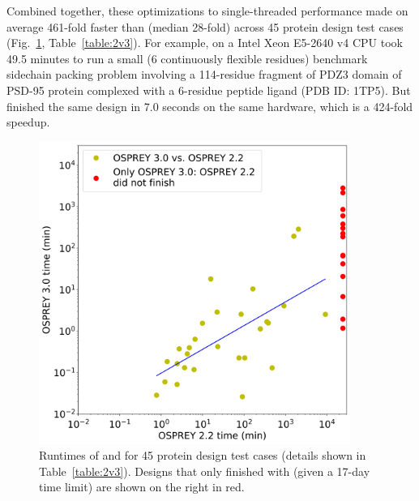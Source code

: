 Combined together, these optimizations to single-threaded performance made  on average 461-fold faster than  (median 28-fold) across 45 protein design test cases (Fig.~\ref{fig:2v3}, Table~\ref{table:2v3}).  For example,  on a Intel Xeon E5-2640 v4 CPU took 49.5 minutes to run a small (6 continuously flexible residues) benchmark sidechain packing problem involving a 114-residue fragment of PDZ3 domain of PSD-95 protein complexed with a 6-residue peptide ligand (PDB ID: 1TP5).  But  finished the same design in 7.0 seconds on the same hardware, which is a 424-fold speedup.  

\begin{figure}
\center
\includegraphics[width=4in]{figures/2v3_times.png}
\caption{Runtimes of  and  for 45 protein design test cases (details shown in Table~\ref{table:2v3}). Designs that only finished with  (given a 17-day time limit) are shown on the right in red.}
\label{fig:2v3}
\end{figure}

